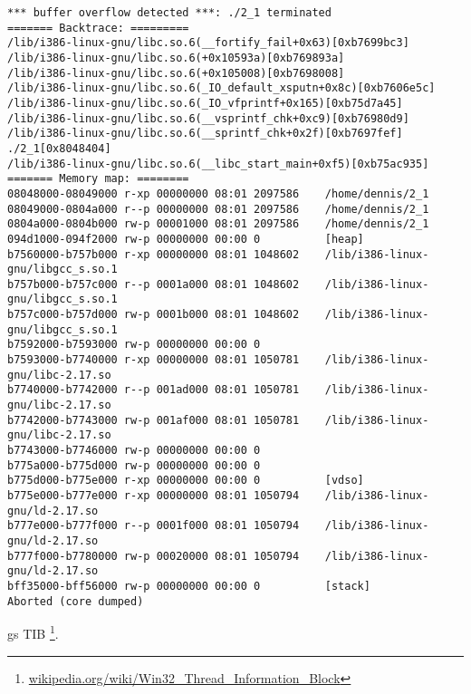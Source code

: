 \begin{lstlisting}
*** buffer overflow detected ***: ./2_1 terminated
======= Backtrace: =========
/lib/i386-linux-gnu/libc.so.6(__fortify_fail+0x63)[0xb7699bc3]
/lib/i386-linux-gnu/libc.so.6(+0x10593a)[0xb769893a]
/lib/i386-linux-gnu/libc.so.6(+0x105008)[0xb7698008]
/lib/i386-linux-gnu/libc.so.6(_IO_default_xsputn+0x8c)[0xb7606e5c]
/lib/i386-linux-gnu/libc.so.6(_IO_vfprintf+0x165)[0xb75d7a45]
/lib/i386-linux-gnu/libc.so.6(__vsprintf_chk+0xc9)[0xb76980d9]
/lib/i386-linux-gnu/libc.so.6(__sprintf_chk+0x2f)[0xb7697fef]
./2_1[0x8048404]
/lib/i386-linux-gnu/libc.so.6(__libc_start_main+0xf5)[0xb75ac935]
======= Memory map: ========
08048000-08049000 r-xp 00000000 08:01 2097586    /home/dennis/2_1
08049000-0804a000 r--p 00000000 08:01 2097586    /home/dennis/2_1
0804a000-0804b000 rw-p 00001000 08:01 2097586    /home/dennis/2_1
094d1000-094f2000 rw-p 00000000 00:00 0          [heap]
b7560000-b757b000 r-xp 00000000 08:01 1048602    /lib/i386-linux-gnu/libgcc_s.so.1
b757b000-b757c000 r--p 0001a000 08:01 1048602    /lib/i386-linux-gnu/libgcc_s.so.1
b757c000-b757d000 rw-p 0001b000 08:01 1048602    /lib/i386-linux-gnu/libgcc_s.so.1
b7592000-b7593000 rw-p 00000000 00:00 0
b7593000-b7740000 r-xp 00000000 08:01 1050781    /lib/i386-linux-gnu/libc-2.17.so
b7740000-b7742000 r--p 001ad000 08:01 1050781    /lib/i386-linux-gnu/libc-2.17.so
b7742000-b7743000 rw-p 001af000 08:01 1050781    /lib/i386-linux-gnu/libc-2.17.so
b7743000-b7746000 rw-p 00000000 00:00 0
b775a000-b775d000 rw-p 00000000 00:00 0
b775d000-b775e000 r-xp 00000000 00:00 0          [vdso]
b775e000-b777e000 r-xp 00000000 08:01 1050794    /lib/i386-linux-gnu/ld-2.17.so
b777e000-b777f000 r--p 0001f000 08:01 1050794    /lib/i386-linux-gnu/ld-2.17.so
b777f000-b7780000 rw-p 00020000 08:01 1050794    /lib/i386-linux-gnu/ld-2.17.so
bff35000-bff56000 rw-p 00000000 00:00 0          [stack]
Aborted (core dumped)
\end{lstlisting}

gs 
\ac{TIB} \footnote{\href{http://go.yurichev.com/17104}{wikipedia.org/wiki/Win32\_Thread\_Information\_Block}}. 

